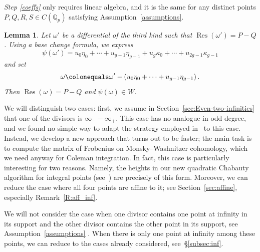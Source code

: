 \documentclass[11pt, a4paper]{amsart}
\newcommand{\Q}{\mathbb{Q}}
\newcommand{\hdr}{\operatorname{H^1_{dR}}}
\newcommand{\hdrh}{\operatorname{H^{1,0}_{dR}}}
\newcommand{\Res}{\operatorname{Res}}
\newtheorem{lemma}[theorem]{Lemma}
\theoremstyle{remark}
\numberwithin{equation}{section}
\newcommand{\sg}{{}}
\newcommand{\sm}{{}}
\begin{document}
\sg{{\it Step \eqref{coeffs}} only requires linear algebra, and it is the same for any distinct points $P,Q,R,S\in C(\Q_p)$ satisfying Assumption~\ref{assumptions}.
\begin{lemma}\label{lm:represent-psi-in-mixed-basis}
Let $\omega'$ be a differential of the third kind such that $\Res(\omega')=P-Q$. Using a base change formula, we express
\[
\psi(\omega')=u_0\eta_0+\cdots+u_{g-1}\eta_{g-1}+u_g\kappa_0+\cdots + u_{2g-1}\kappa_{g-1}
\]
and set
\[
\omega\colonequals\omega'-(u_0\eta_0+\cdots+u_{g-1}\eta_{g-1})\,.
\]
 Then $\Res(\omega) = P-Q$ and $\psi(\omega)\in W$.
\end{lemma}}



We will distinguish two cases: first, we assume
in Section~\ref{sec:Even-two-infinities} that 
one of the divisors is $\infty_- - \infty_+$. This case has no analogue in
odd degree, and we found no simple way to adapt the strategy employed
in~\cite{BBHeights} to this case. Instead, we develop a new approach that
turns out to be faster; the main task is to compute the matrix of Frobenius
on Monsky--Washnitzer cohomology,
which we need anyway for Coleman integration. In fact, 
this case is particularly interesting for two reasons. Namely,
the heights in our new quadratic Chabauty
algorithm for integral points (see~\cite{LinQC}) are precisely of this
form. Moreover, we can reduce the case where all four points are 
affine to it; see Section~\ref{sec:affine}, especially Remark~\ref{R:aff_inf}.


We will not consider the case when one divisor contains one point at infinity
in its support and the other divisor contains the other point in its support, see 
\sg{Assumption~\ref{assumptions}} . When there is only one point at infinity among
these points, we can reduce to the cases already considered,
see~\S\ref{subsec:inf}.
\end{document}
